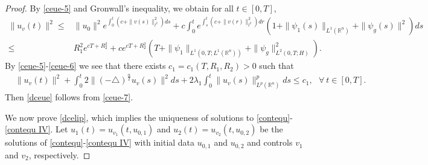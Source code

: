 \documentclass[11pt]{article}
\numberwithin{equation}{section}
\theoremstyle{plain}
\def\leq{\leqslant}
\begin{document}
\begin{proof}
 By \eqref{ceue-5} and Gronwall's inequality,
 we obtain  for all  $t \in [0,T]$,
\begin{align}\label{ceue-6}
        \| u_v(t) \|^2
 \leq & \| u_0 \|^2 e^{\int^{t}_{0} \left( c + \|v(s)\|_{l^2}^2 \right) ds}
       + c \int_0^t e^{\int_s^t \left( c + \|v(r)\|_{l^2}^2 \right) dr}
                   \left( 1 + \| \psi_{1}(s) \|_{L^1(\mathbb{R}^n)}
                            + \| \psi_g(s) \|^2
                   \right)
            ds  \nonumber \\
 \leq & R_1^2 e^{cT + R_2^2}
       + c e^{ cT + R_2^2 }
                   \left( T + \| \psi_{1} \|_{L^1(0,T; L^1(\mathbb{R}^n) ) }
                            + \| \psi_g \|_{L^2(0,T; H) }^2
                   \right).
\end{align}
By \eqref{ceue-5}-\eqref{ceue-6} we
see that   there exists   $c_1 = c_1(T, R_1, R_2)>0$ such that
\begin{align}\label{ceue-7}
      & \| u_v(t) \|^2
        + \int_0^t 2 \| (-\triangle)^{\frac{\alpha}{2}} u_v(s) \|^2 ds
        + 2 \lambda_1 \int_0^t \| u_v(s) \|_{L^p(\mathbb{R}^n)}^{p} ds
      \leq c_1 , \ \ \  \forall \  t \in [0,T].
\end{align}
Then \eqref{dceue} follows from
\eqref{ceue-7}.


We now  prove \eqref{dcelip},
 which implies   the uniqueness of solutions to \eqref{contequ}-\eqref{contequ IV}.
  Let $u_1(t) = u_{v_1}(t, u_{0,1})$
 and $u_2(t) = u_{v_2}(t, u_{0,2})$
  be the solutions of \eqref{contequ}-\eqref{contequ IV} with
  initial data
  $u_{0,1}$ and
  $u_{0,2}$ and
    controls $v_1$
  and $v_2$,
  respectively.


\end{proof}
\end{document}
